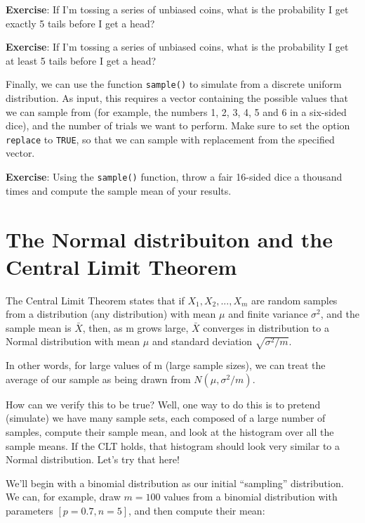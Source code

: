\documentclass[
]{book}
\begin{document}
\textbf{Exercise}: If I'm tossing a series of unbiased coins, what is the probability I get exactly 5 tails before I get a head?

\textbf{Exercise}: If I'm tossing a series of unbiased coins, what is the probability I get at least 5 tails before I get a head?

Finally, we can use the function \texttt{sample()} to simulate from a discrete uniform distribution. As input, this requires a vector containing the possible values that we can sample from (for example, the numbers 1, 2, 3, 4, 5 and 6 in a six-sided dice), and the number of trials we want to perform. Make sure to set the option \texttt{replace} to \texttt{TRUE}, so that we can sample with replacement from the specified vector.

\textbf{Exercise}: Using the \texttt{sample()} function, throw a fair 16-sided dice a thousand times and compute the sample mean of your results.

\hypertarget{the-normal-distribuiton-and-the-central-limit-theorem}{%
\section{The Normal distribuiton and the Central Limit Theorem}\label{the-normal-distribuiton-and-the-central-limit-theorem}}

The Central Limit Theorem states that if \(X_1, X_2, ..., X_m\) are random samples from a distribution (any distribution) with mean \(\mu\) and finite variance \(\sigma^2\), and the sample mean is \(\bar{X}\), then, as m grows large, \(\bar{X}\) converges in distribution to a Normal distribution with mean \(\mu\) and standard deviation \(\sqrt{\sigma^2 /m}\).

In other words, for large values of m (large sample sizes), we can treat the average of our sample as being drawn from \(N(\mu,\sigma^2/m)\).

How can we verify this to be true? Well, one way to do this is to pretend (simulate) we have many sample sets, each composed of a large number of samples, compute their sample mean, and look at the histogram over all the sample means. If the CLT holds, that histogram should look very similar to a Normal distribution. Let's try that here!

We'll begin with a binomial distribution as our initial ``sampling'' distribution. We can, for example, draw \(m=100\) values from a binomial distribution with parameters \([p=0.7,n=5]\), and then compute their mean:
\end{document}
